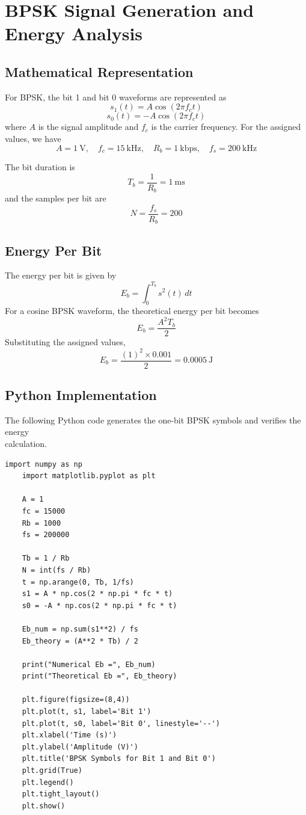 \chapter{BPSK Signal Generation and Energy Analysis}
\section{Mathematical Representation}
For BPSK, the bit 1 and bit 0 waveforms are represented as
\[s_1(t) = A \cos(2\pi f_c t)\]\[s_0(t) = -A \cos(2\pi f_c t)\]
where \(A\) is the signal amplitude and \(f_c\) is the carrier frequency.
For the assigned values, we have
\[
A = 1~\text{V}, \quad f_c = 15~\text{kHz}, \quad R_b = 1~\text{kbps}, \quad f_s = 200~\text{kHz}
\]

The bit duration is
\[
T_b = \frac{1}{R_b} = 1~\text{ms}
\]
and the samples per bit are
\[
N = \frac{f_s}{R_b} = 200
\]

\section{Energy Per Bit}
The energy per bit is given by
\[
E_b = \int_0^{T_b} s^2(t)\,dt
\]
For a cosine BPSK waveform, the theoretical energy per bit becomes
\[
E_b = \frac{A^2 T_b}{2}
\]
Substituting the assigned values,
\[
E_b = \frac{(1)^2 \times 0.001}{2} = 0.0005~\text{J}
\]

\section{Python Implementation}
The following Python code generates the one-bit BPSK symbols and verifies the energy \\calculation.

\begin{lstlisting}[style=pythonstyle, caption={BPSK Symbol Generation and Energy Calculation}]
    import numpy as np
    import matplotlib.pyplot as plt
    
    A = 1
    fc = 15000
    Rb = 1000
    fs = 200000
    
    Tb = 1 / Rb
    N = int(fs / Rb)
    t = np.arange(0, Tb, 1/fs)
    s1 = A * np.cos(2 * np.pi * fc * t)
    s0 = -A * np.cos(2 * np.pi * fc * t)
    
    Eb_num = np.sum(s1**2) / fs
    Eb_theory = (A**2 * Tb) / 2

    print("Numerical Eb =", Eb_num)
    print("Theoretical Eb =", Eb_theory)
    
    plt.figure(figsize=(8,4))
    plt.plot(t, s1, label='Bit 1')
    plt.plot(t, s0, label='Bit 0', linestyle='--')
    plt.xlabel('Time (s)')
    plt.ylabel('Amplitude (V)')
    plt.title('BPSK Symbols for Bit 1 and Bit 0')
    plt.grid(True)
    plt.legend()
    plt.tight_layout()
    plt.show()
    \end{lstlisting}


